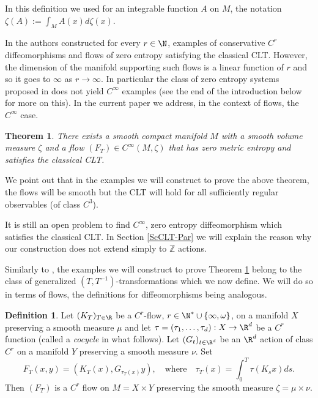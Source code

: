 \documentclass[10pt]{amsart}
\newcommand\Z{\mathbb{Z}}
\theoremstyle{definition}
\newtheorem{definition}{Definition}
\theoremstyle{plain}
\newtheorem{Main}{Theorem}
\begin{document}
In this definition we used for an integrable function $A$ on $M$, the notation $\zeta(A):=\int_M A(x)d\zeta(x)$.

In \cite{DDKN} the authors constructed for every $r\in \N$, examples of conservative $C^r$ diffeomorphisms and flows of zero entropy satisfying the classical CLT. However, the dimension of the manifold supporting such flows is a linear function of $r$ and so it goes to $\infty$ as $r\to \infty$. In particular the class of zero entropy systems proposed in \cite{DDKN} does not yield $C^\infty$ examples (see the end of the introduction below for more on this). In the current paper we address, in the context of flows, the $C^\infty$ case.


\begin{Main}\label{thm:main2}
There exists a smooth compact manifold $M$ with a smooth volume measure $\zeta$
and a flow $(F_T) \in C^\infty(M,\zeta)$ that has zero metric entropy and satisfies the classical CLT.
\end{Main}


We point out that in the examples we will construct to prove the above theorem, the flows will be smooth
but the CLT will hold for all sufficiently regular observables (of class $C^3$).

It is still an open problem to find $C^\infty$, zero entropy diffeomorphism which satisfies the classical CLT. In Section \ref{ScCLT-Par}
we will explain the reason why our construction does not extend simply to $\Z$ actions.

Similarly to \cite{DDKN}, the examples we will construct to prove Theorem \ref{thm:main2} belong to the class of generalized $(T,T^{-1})$-transformations which we now define. We will do so in terms of flows, the definitions for diffeomorphisms being analogous.

\begin{definition}\label{def:TTinv}
Let $(K_T)_{T\in \R}$ be a $C^r$-flow, $r\in \N^*\cup \{\infty, \omega\}$, on a manifold $X$ preserving a smooth measure $\mu$ and let $\tau=(\tau_1,\ldots,\tau_d):X\to \R^d$ be a
$C^r$ function (called a \emph{cocycle} in what follows). Let $(G_t)_{t\in \R^d}$ be an $\R^d$ action of class $C^r$ on a manifold $Y$ preserving a smooth measure $\nu$. Set
\begin{equation}\label{eq:Tcont}
F_T(x,y)=(K_T(x),G_{\tau_T(x)}y),
\quad\text{where}\quad \tau_T(x)=\int_0^T\tau(K_s x)ds.
\end{equation}
Then $(F_T)$ is a $C^r$ flow on $M=X\times Y$ preserving the smooth measure $\zeta=\mu\times \nu$.
\end{definition}
\end{document}
